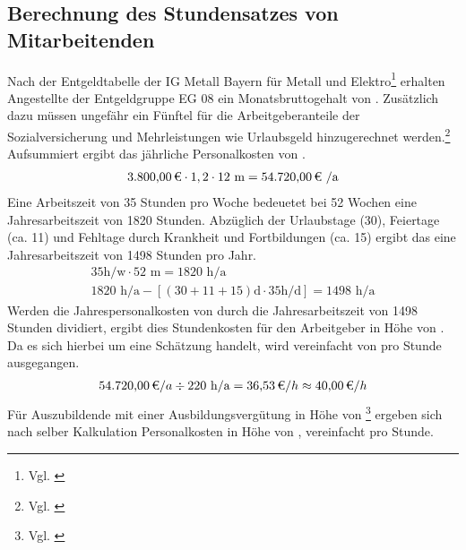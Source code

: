 
\subsection{Berechnung des Stundensatzes von Mitarbeitenden}
\label{app:Stundensatz}
Nach der Entgeldtabelle der IG Metall Bayern für Metall und Elektro\footnote{Vgl. \cite{Entgeldtabelle}} erhalten Angestellte der Entgeldgruppe EG 08 ein Monatsbruttogehalt von . Zusätzlich dazu müssen ungefähr ein Fünftel für die Arbeitgeberanteile der Sozialversicherung und Mehrleistungen wie Urlaubsgeld hinzugerechnet werden.\footnote{Vgl. \cite{Personalkosten}} Aufsummiert ergibt das jährliche Personalkosten von .
\begin{eqnarray}
\eur{3.800,00} \cdot 1,2 \cdot 12 \mbox{ m} = \eur{54.720,00} \mbox{ /a}
\end{eqnarray}
Eine Arbeitszeit von 35 Stunden pro Woche bedeuetet bei 52 Wochen eine Jahresarbeitszeit von 1820 Stunden. Abzüglich der Urlaubstage (30), Feiertage (ca. 11) und Fehltage durch Krankheit und Fortbildungen (ca. 15) ergibt das eine Jahresarbeitszeit von 1498 Stunden pro Jahr.
\begin{eqnarray}
35 \mbox{h/w} \cdot 52 \mbox{ m} = 1820 \mbox{ h/a} \\
1820 \mbox{ h/a} - [(30+11+15) \mbox{d} \cdot 35 \mbox{h/d}] = 1498 \mbox{ h/a}
\end{eqnarray}
Werden die Jahrespersonalkosten von  durch die Jahresarbeitszeit von 1498 Stunden dividiert, ergibt dies Stundenkosten für den Arbeitgeber in Höhe von . Da es sich hierbei um eine Schätzung handelt, wird vereinfacht von  pro Stunde ausgegangen.  
\begin{eqnarray}
\eur{54.720,00} /a \div 220 \mbox{ h/a} = \eur{36,53} /h \approx \eur{40,00} /h 
\end{eqnarray}
Für Auszubildende mit einer Ausbildungsvergütung in Höhe von  \footnote{Vgl. \cite{EntgeldtabelleAzubis}} ergeben sich nach selber Kalkulation Personalkosten in Höhe von , vereinfacht  pro Stunde.